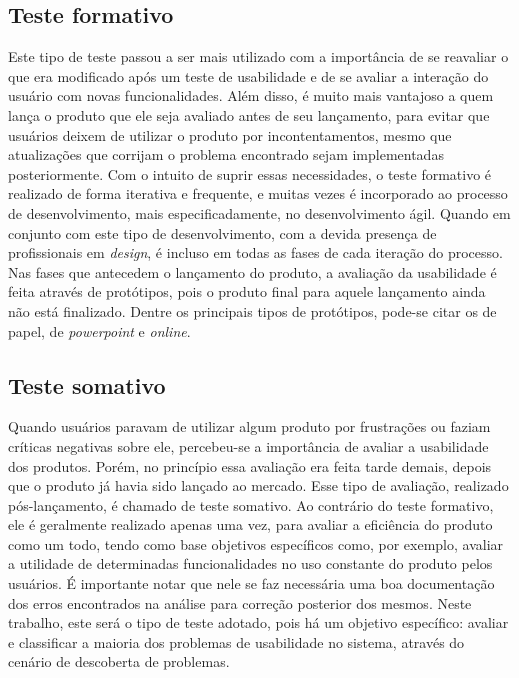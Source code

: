 \subsection{Teste formativo}
\label{sec:teste-formativo}
    Este tipo de teste passou a ser mais utilizado com a importância de se reavaliar o que era modificado após um teste de usabilidade e de se avaliar a interação do usuário com novas funcionalidades. Além disso, é muito mais vantajoso a quem lança o produto que ele seja avaliado antes de seu lançamento, para evitar que usuários deixem de utilizar o produto por incontentamentos, mesmo que atualizações que corrijam o problema encontrado sejam implementadas posteriormente. 
    Com o intuito de suprir essas necessidades, o teste formativo é realizado de forma iterativa e frequente, e muitas vezes é incorporado ao processo de desenvolvimento, mais especificadamente, no desenvolvimento ágil. Quando em conjunto com este tipo de desenvolvimento, com a devida presença de profissionais em \emph{design}, é incluso em todas as fases de cada iteração do processo.
    Nas fases que antecedem o lançamento do produto, a avaliação da usabilidade é feita através de protótipos, pois o produto final para aquele lançamento ainda não está finalizado. Dentre os principais tipos de protótipos, pode-se citar os de papel, de \emph{powerpoint} e \emph{online}. 
    

\subsection{Teste somativo}
\label{sec:teste-somativo}
    Quando usuários paravam de utilizar algum produto por frustrações ou faziam críticas negativas sobre ele, percebeu-se a importância de avaliar a usabilidade dos produtos. Porém, no princípio essa avaliação era feita tarde demais, depois que o produto já havia sido lançado ao mercado. Esse tipo de avaliação, realizado pós-lançamento, é chamado de teste somativo. 
    Ao contrário do teste formativo, ele é geralmente realizado apenas uma vez, para avaliar a eficiência do produto como um todo, tendo como base objetivos específicos \cite{barnum:01} como, por exemplo, avaliar a utilidade de determinadas funcionalidades no uso constante do produto pelos usuários. É importante notar que nele se faz necessária uma boa documentação dos erros encontrados na análise para correção posterior dos mesmos.
    Neste trabalho, este será o tipo de teste adotado, pois há um objetivo específico: avaliar e classificar a maioria dos problemas de usabilidade no sistema, através do cenário de descoberta de problemas.
    
